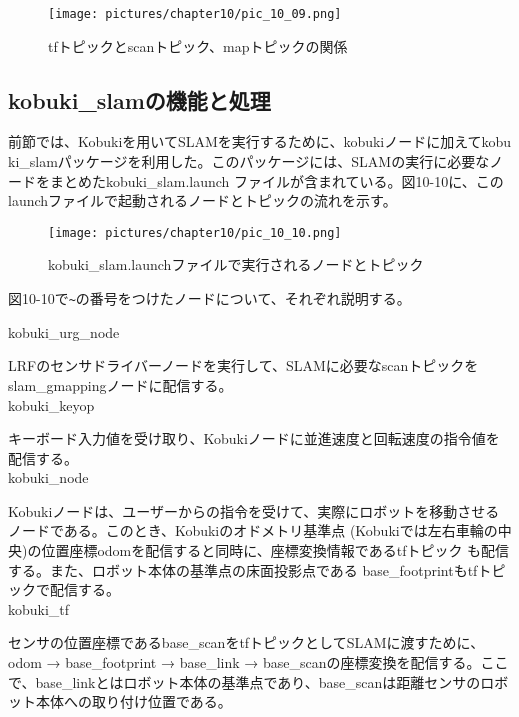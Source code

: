 \begin{figure}[htp]
  \centering
  \texttt{[image: pictures/chapter10/pic\_10\_09.png]}
  \caption{tfトピックとscanトピック、mapトピックの関係}
\end{figure}

\subsection{kobuki\_slamの機能と処理}

前節では、Kobukiを用いてSLAMを実行するために、kobukiノードに加えてkobu\\ki\_slamパッケージを利用した。このパッケージには、SLAMの実行に必要なノードをまとめたkobuki\_slam.launch ファイルが含まれている。図10-10に、このlaunchファイルで起動されるノードとトピックの流れを示す。

\begin{figure}[htp]
  \centering
  \texttt{[image: pictures/chapter10/pic\_10\_10.png]}
  \caption{kobuki\_slam.launchファイルで実行されるノードとトピック}
\end{figure}

図10-10で\verb|~|の番号をつけたノードについて、それぞれ説明する。\\

\setcounter{num}{0}

\circled{\thenum} kobuki\_urg\_node

LRFのセンサドライバーノードを実行して、SLAMに必要なscanトピックをslam\_gmappingノードに配信する。\\

\circled{\thenum} kobuki\_keyop

キーボード入力値を受け取り、Kobukiノードに並進速度と回転速度の指令値を配信する。\\

\circled{\thenum} kobuki\_node

Kobukiノードは、ユーザーからの指令を受けて、実際にロボットを移動させるノードである。このとき、Kobukiのオドメトリ基準点 (Kobukiでは左右車輪の中央)の位置座標odomを配信すると同時に、座標変換情報であるtfトピック  も配信する。また、ロボット本体の基準点の床面投影点である  base\_footprintもtfトピックで配信する。\\

\circled{\thenum} kobuki\_tf

センサの位置座標であるbase\_scanをtfトピックとしてSLAMに渡すために、odom → base\_footprint → base\_link → base\_scanの座標変換を配信する。ここで、base\_linkとはロボット本体の基準点であり、base\_scanは距離センサのロボット本体への取り付け位置である。\\

